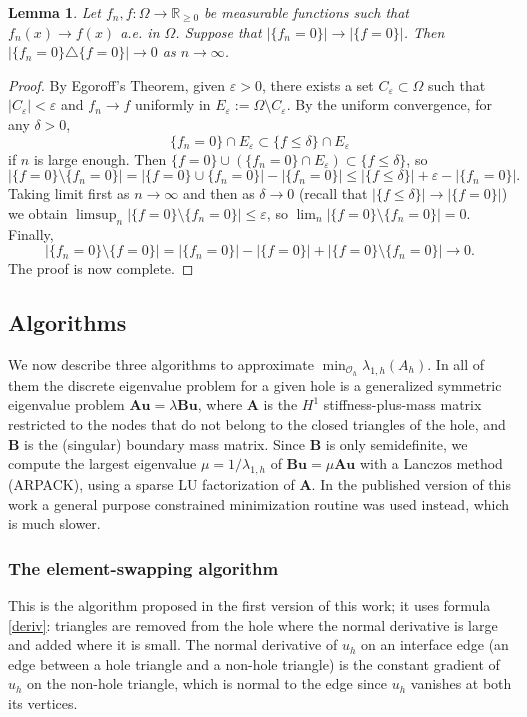 \documentclass[11pt]{amsart}
\newtheorem{lemma}{Lemma}[section]
\theoremstyle{remark}
\numberwithin{equation}{section}
\newcommand{\R}{\mathbb{R}}
\begin{document}
\begin{lemma}\label{l.sym}
Let $f_n,f:\Omega\to\R_{\ge0}$ be measurable functions such that $f_n(x)\to f(x)$ a.e. in $\Omega$. Suppose that $|\{f_n=0\}|\to|\{f=0\}|$. Then $|\{f_n=0\}\triangle\{f=0\}|\to0$ as $n\to\infty$.
\end{lemma}

\begin{proof}
By Egoroff's Theorem, given $\varepsilon>0$, there exists a set $C_\varepsilon\subset\Omega$ such that $|C_\varepsilon|<\varepsilon$ and $f_n\to f$ uniformly in $E_\varepsilon:=\Omega\setminus C_\varepsilon$. By the uniform convergence, for any $\delta>0$,
\begin{equation}\label{inc}
\{f_n=0\}\cap E_\varepsilon\subset\{f\le\delta\}\cap E_\varepsilon
\end{equation}
if $n$ is large enough. Then $\{f=0\}\cup(\{f_n=0\}\cap E_\varepsilon)\subset\{f\le\delta\}$, so
\[
|\{f=0\}\setminus\{f_n=0\}|=|\{f=0\}\cup\{f_n=0\}|-|\{f_n=0\}|\le|\{f\le\delta\}|+\varepsilon-|\{f_n=0\}|.
\]
Taking limit first as $n\to\infty$ and then as $\delta\to0$ (recall that $|\{f\le\delta\}|\to|\{f=0\}|$) we obtain $\limsup_n|\{f=0\}\setminus\{f_n=0\}|\le\varepsilon$, so $\lim_n|\{f=0\}\setminus\{f_n=0\}|=0$. Finally,
\[
|\{f_n=0\}\setminus\{f=0\}|=|\{f_n=0\}|-|\{f=0\}|+|\{f=0\}\setminus\{f_n=0\}|\to0.
\]
The proof is now complete.
\end{proof}

\subsection{Algorithms}\label{sec.alg}
We now describe three algorithms to approximate $\min_{\mathcal{O}_h}\lambda_{1,h}(A_h)$. In all of them the discrete eigenvalue problem for a given hole is a generalized symmetric eigenvalue problem $\mathbf{A}\mathbf{u}=\lambda\mathbf{B}\mathbf{u}$, where $\mathbf{A}$ is the $H^1$ stiffness-plus-mass matrix restricted to the nodes that do not belong to the closed triangles of the hole, and $\mathbf{B}$ is the (singular) boundary mass matrix. Since $\mathbf{B}$ is only semidefinite, we compute the largest eigenvalue $\mu=1/\lambda_{1,h}$ of $\mathbf{B}\mathbf{u}=\mu\mathbf{A}\mathbf{u}$ with a Lanczos method (ARPACK), using a sparse LU factorization of $\mathbf{A}$. In the published version of this work a general purpose constrained minimization routine was used instead, which is much slower.

\subsubsection{The element-swapping algorithm}
This is the algorithm proposed in the first version of this work; it uses formula \eqref{deriv}: triangles are removed from the hole where the normal derivative is large and added where it is small. The normal derivative of $u_h$ on an interface edge (an edge between a hole triangle and a non-hole triangle) is the constant gradient of $u_h$ on the non-hole triangle, which is normal to the edge since $u_h$ vanishes at both its vertices.
\end{document}
